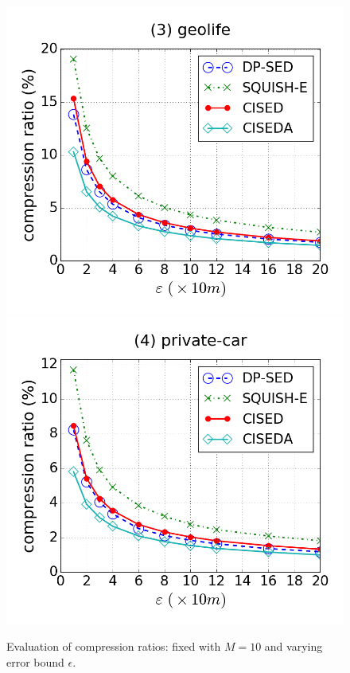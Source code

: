 {\begin{figure}[tb!]
\includegraphics[scale = 0.250]{figures/Exp-cr-epsilon-geolife.png}
\includegraphics[scale = 0.250]{figures/Exp-cr-epsilon-private.png}
\vspace{-2ex}
\caption{\small Evaluation of compression ratios: fixed with $M=10$ and varying error bound $\epsilon$.}
\label{fig:cr-m10}
\vspace{-2.0ex}
\end{figure}
}%



